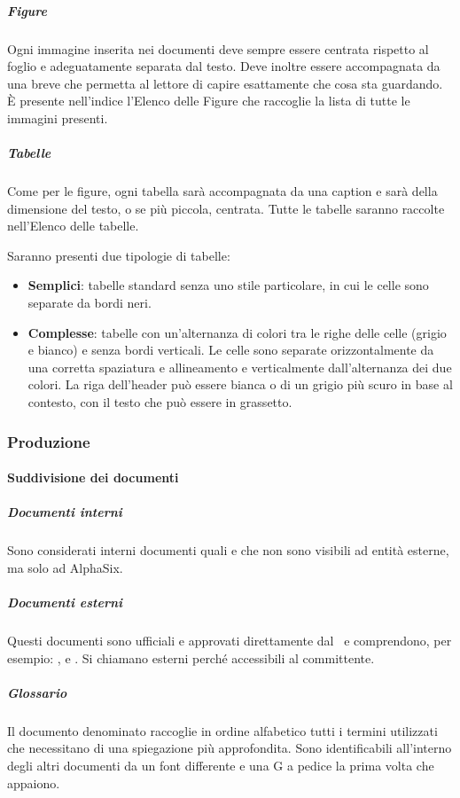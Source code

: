 			\subparagraph{Figure}
			Ogni immagine inserita nei documenti deve sempre essere centrata rispetto al foglio e adeguatamente separata dal testo. Deve inoltre essere
			accompagnata da una breve  che permetta al lettore di capire esattamente che cosa sta guardando. È presente nell'indice l'Elenco
			delle Figure che raccoglie la lista di tutte le immagini presenti.

			\subparagraph{Tabelle}
			Come per le figure, ogni tabella sarà accompagnata da una caption e sarà della dimensione del testo, o se più piccola, centrata.
			Tutte le tabelle saranno raccolte nell'Elenco delle tabelle.\par
			Saranno presenti due tipologie di tabelle:
			\begin{itemize}
				\item \textbf{Semplici}: tabelle standard senza uno stile particolare, in cui le celle sono separate da bordi neri.
				\item \textbf{Complesse}: tabelle con un'alternanza di colori tra le righe delle celle (grigio e bianco) e senza bordi verticali.
					Le celle sono separate orizzontalmente da una corretta spaziatura e allineamento e verticalmente dall'alternanza dei due colori.
					La riga dell'header può essere bianca o di un grigio più scuro in base al contesto, con il testo che può essere in grassetto.
			\end{itemize}


		\subsubsection{Produzione}

			\paragraph{Suddivisione dei documenti}

			\subparagraph{Documenti interni}
			Sono considerati interni documenti quali  e  che non sono visibili ad entità esterne,
			ma solo ad AlphaSix.

			\subparagraph{Documenti esterni}
			Questi documenti sono ufficiali e approvati direttamente dal \Res\ e comprendono, per esempio: ,
			 e . Si chiamano esterni perché accessibili al committente.

			\subparagraph{Glossario}
			Il documento denominato  raccoglie in ordine alfabetico tutti i termini utilizzati che necessitano di una spiegazione più approfondita.
			Sono identificabili all'interno degli altri documenti da un font differente e una G a pedice la prima volta che appaiono.


